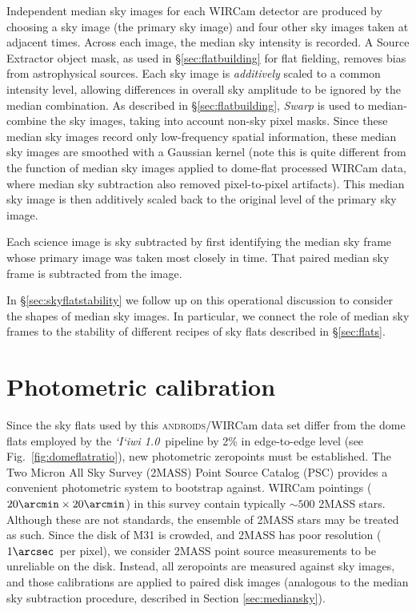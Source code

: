 \documentclass[iop]{emulateapj}
\newcommand{\sw}[1]{\textit{#1}} %
\newcommand{\iiwione}{\sw{`I`iwi 1.0}}
\newcommand{\androids}{\textsc{androids}}
\newcommand{\Fig}[1]{Fig.~\ref{fig:#1}}  %
\newcommand{\Sec}[1]{\S\ref{sec:#1}}  %
\begin{document}
Independent median sky images for each WIRCam detector are produced by choosing a sky image (the primary sky image) and four other sky images taken at adjacent times.
Across each image, the median sky intensity is recorded.
A Source Extractor object mask, as used in \Sec{flatbuilding} for flat fielding, removes bias from astrophysical sources.
Each sky image is \emph{additively} scaled to a common intensity level, allowing differences in overall sky amplitude to be ignored by the median combination.
As described in \Sec{flatbuilding}, \sw{Swarp} is used to median-combine the sky images, taking into account non-sky pixel masks.
Since these median sky images record only low-frequency spatial information, these median sky images are smoothed with a Gaussian kernel (note this is quite different from the function of median sky images applied to dome-flat processed WIRCam data, where median sky subtraction also removed pixel-to-pixel artifacts).
This median sky image is then additively scaled back to the original level of the primary sky image.

Each science image is sky subtracted by first identifying the median sky frame whose primary image was taken most closely in time.
That paired median sky frame is subtracted from the image.

In \Sec{skyflatstability} we follow up on this operational discussion to consider the shapes of median sky images. In particular, we connect the role of median sky frames to the stability of different recipes of sky flats described in \Sec{flats}.

\section{Photometric calibration}
\label{sec:photocal}

Since the sky flats used by this \androids/WIRCam data set differ from the dome flats employed by the \iiwione\ pipeline by 2\% in edge-to-edge level (see \Fig{domeflatratio}), new photometric zeropoints must be established.
The Two Micron All Sky Survey (2MASS) Point Source Catalog (PSC) \citep{Skrutskie:2006} provides a convenient photometric system to bootstrap against.
WIRCam pointings ($20\arcmin \times 20\arcmin$) in this survey contain typically $\sim 500$ 2MASS stars.
Although these are not standards, the ensemble of 2MASS stars may be treated as such.
Since the disk of M31 is crowded, and 2MASS has poor resolution ($1\arcsec$~per pixel), we consider 2MASS point source measurements to be unreliable on the disk.
Instead, all zeropoints are measured against sky images, and those calibrations are applied to paired disk images (analogous to the median sky subtraction procedure, described in Section \ref{sec:mediansky}).
\end{document}
